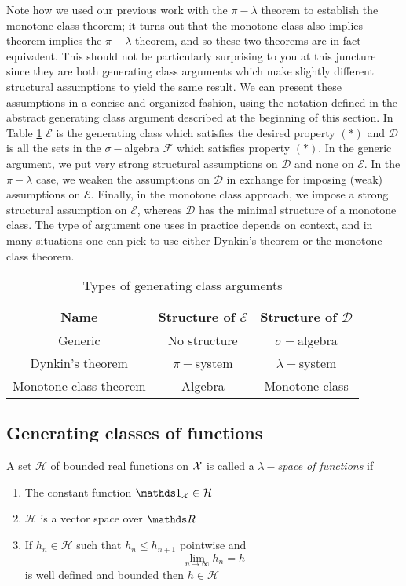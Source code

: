 Note how we used our previous work with the $\pi-\lambda$ theorem
to establish the monotone class theorem; it turns out that the monotone
class also implies theorem implies the $\pi-\lambda$ theorem, and
so these two theorems are in fact equivalent. This should not be particularly
surprising to you at this juncture since they are both generating
class arguments which make slightly different structural assumptions
to yield the same result. We can present these assumptions in a concise
and organized fashion, using the notation defined in the abstract
generating class argument described at the beginning of this section.
In Table \ref{tab:typesGenClassArg} $\mathcal{E}$ is the generating
class which satisfies the desired property $\left(*\right)$ and $\mathcal{D}$
is all the sets in the $\sigma-$algebra $\mathcal{F}$ which satisfies
property $\left(*\right)$. In the generic argument, we put very strong
structural assumptions on $\mathcal{D}$ and none on $\mathcal{E}$.
In the $\pi-\lambda$ case, we weaken the assumptions on $\mathcal{D}$
in exchange for imposing (weak) assumptions on $\mathcal{E}$. Finally,
in the monotone class approach, we impose a strong structural assumption
on $\mathcal{E}$, whereas $\mathcal{D}$ has the minimal structure
of a monotone class. The type of argument one uses in practice depends
on context, and in many situations one can pick to use either Dynkin's
theorem or the monotone class theorem.

\begin{table}[H]
\caption{\label{tab:typesGenClassArg}Types of generating class arguments}

\centering{}%
\begin{tabular}{ccc}
\hline 
Name & Structure of $\mathcal{E}$ & Structure of $\mathcal{D}$\tabularnewline
\hline 
\hline 
Generic & No structure & $\sigma-$algebra\tabularnewline
Dynkin's theorem & $\pi-$system & $\lambda-$system\tabularnewline
Monotone class theorem & Algebra  & Monotone class\tabularnewline
\hline 
\end{tabular}
\end{table}


\subsection{Generating classes of functions}
\begin{defn}
\label{def:lambdaSpaceOfFunctions}A set $\mathcal{H}$ of bounded
real functions on $\mathcal{X}$ is called a $\lambda-$\emph{space of functions
}if

\begin{enumerate}[label=(\roman*),leftmargin=.1\linewidth,rightmargin=.4\linewidth]
	\item The constant function $\indicate_{\X} \in \mathcal{H} $
	\item $\mathcal{H}$ is a vector space over $\R$
	\item If $h_n \in \mathcal{H} $ such that $h_n \leq h_{n+1} $ pointwise and
		\[
					\lim_{n\to\infty} h_n = h
		\]
		 is well defined and bounded then $h \in \mathcal{H}$
\end{enumerate}
\end{defn}

